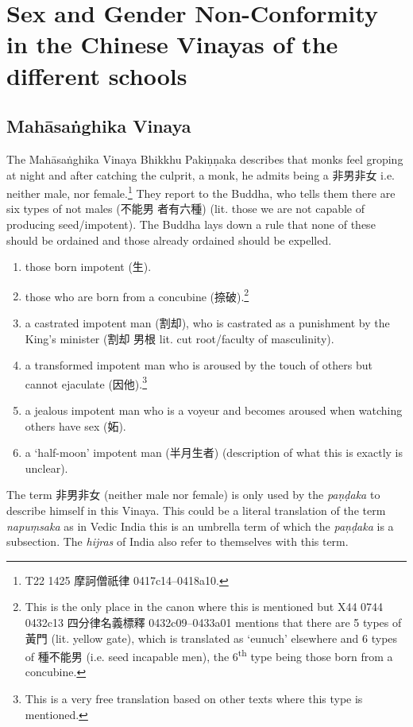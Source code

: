 \section{Sex and Gender Non-Conformity in the Chinese Vinayas of the different schools}
\label{appendix1}

\subsection{Mahāsaṅghika Vinaya}
The Mahāsaṅghika Vinaya Bhikkhu Pakiṇṇaka describes that monks feel groping at night and after catching the culprit, a monk, he admits being a 非男非女 i.e. neither male, nor female.\footnote{T22 1425 摩訶僧祇律 0417c14–0418a10.} They report to the Buddha, who tells them there are six types of not males (不能男 者有六種) (lit. those we are not capable of producing seed/impotent). The Buddha lays down a rule that none of these should be ordained and those already ordained should be expelled.

\begin{enumerate}
\item those born impotent (生). 
\item those who are born from a concubine (捺破).\footnote{This is the only place in the canon where this is mentioned but X44 0744 0432c13 四分律名義標釋 0432c09–0433a01 mentions that there are 5 types of 黃門 (lit. yellow gate), which is translated as `eunuch' elsewhere and 6 types of 種不能男 (i.e. seed incapable men), the 6\textsuperscript{th} type being those born from a concubine.}
\item a castrated impotent man (割却), who is castrated as a punishment by the King's minister (割却 男根 lit. cut root/faculty of masculinity).
\item a transformed impotent man who is aroused by the touch of others but cannot ejaculate (因他).\footnote{This is a very free translation based on other texts where this type is mentioned.}
\item a jealous impotent man who is a voyeur and becomes aroused when watching others have sex (妬).
\item a `half-moon' impotent man (半月生者) (description of what this is exactly is unclear).
\end{enumerate}

The term 非男非女 (neither male nor female) is only used by the {\em paṇḍaka} to describe himself in this Vinaya. This could be a literal translation of the term {\em napuṃsaka} as in Vedic India this is an umbrella term of which the {\em paṇḍaka} is a subsection. The {\em hijras} of India also refer to themselves with this term.

